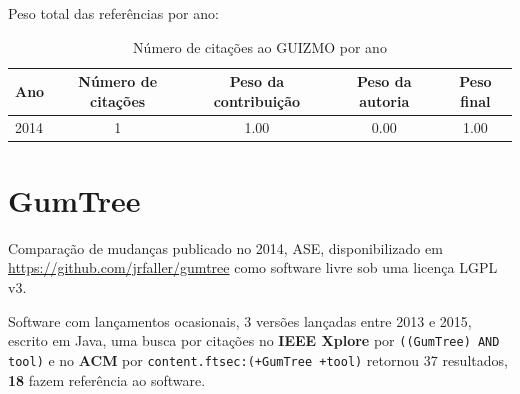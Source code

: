 Peso total das referências por ano:

\begin{table}[h]
\caption{Número de citações ao GUIZMO por ano}
\centering
\begin{tabular}{| l | c | c | c | c |}
  \hline
  Ano & Número de citações & Peso da contribuição & Peso da autoria & Peso final \\
  \hline
  2014
    & 1
    & 1.00
    & 0.00
    & 1.00 \\
  \hline
\end{tabular}
\end{table}


\section{GumTree}

Comparação de mudanças
publicado no 2014, ASE,
disponibilizado em \url{https://github.com/jrfaller/gumtree}
como software livre
sob uma licença LGPL v3.

Software com lançamentos ocasionais,
3 versões lançadas
entre 2013 e 2015,
escrito em Java,
uma busca por citações no {\bf IEEE Xplore} por
\texttt{((GumTree) AND tool)}
e no {\bf ACM} por
\texttt{content.ftsec:(+GumTree +tool)}
retornou
37 resultados,
{\bf 18} fazem referência ao software.

